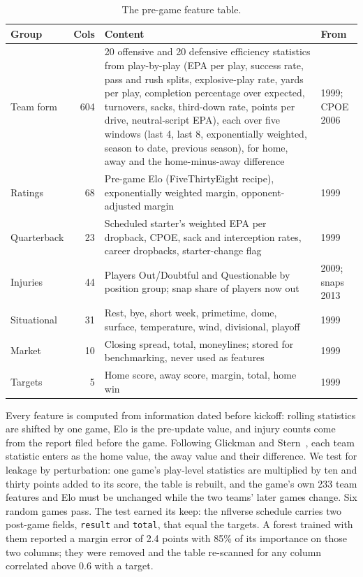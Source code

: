 \begin{table}[H]
\centering
\small
\begin{tabular}{p{2.2cm}rp{8.3cm}p{1.9cm}}
\toprule
\textbf{Group} & \textbf{Cols} & \textbf{Content} & \textbf{From} \\
\midrule
Team form & 604 & 20 offensive and 20 defensive efficiency statistics from play-by-play (EPA per play, success rate, pass and rush splits, explosive-play rate, yards per play, completion percentage over expected, turnovers, sacks, third-down rate, points per drive, neutral-script EPA), each over five windows (last 4, last 8, exponentially weighted, season to date, previous season), for home, away and the home-minus-away difference & 1999; CPOE 2006 \\
Ratings & 68 & Pre-game Elo (FiveThirtyEight recipe), exponentially weighted margin, opponent-adjusted margin & 1999 \\
Quarterback & 23 & Scheduled starter's weighted EPA per dropback, CPOE, sack and interception rates, career dropbacks, starter-change flag & 1999 \\
Injuries & 44 & Players Out/Doubtful and Questionable by position group; snap share of players now out & 2009; snaps 2013 \\
Situational & 31 & Rest, bye, short week, primetime, dome, surface, temperature, wind, divisional, playoff & 1999 \\
Market & 10 & Closing spread, total, moneylines; stored for benchmarking, never used as features & 1999 \\
Targets & 5 & Home score, away score, margin, total, home win & 1999 \\
\bottomrule
\end{tabular}
\caption{The pre-game feature table.}
\label{tab:features}
\end{table}

Every feature is computed from information dated before kickoff: rolling statistics are shifted by one game, Elo is the pre-update value, and injury counts come from the report filed before the game. Following Glickman and Stern~\cite{glickmanstern2017}, each team statistic enters as the home value, the away value and their difference. We test for leakage by perturbation: one game's play-level statistics are multiplied by ten and thirty points added to its score, the table is rebuilt, and the game's own 233 team features and Elo must be unchanged while the two teams' later games change. Six random games pass. The test earned its keep: the nflverse schedule carries two post-game fields, \texttt{result} and \texttt{total}, that equal the targets. A forest trained with them reported a margin error of 2.4 points with 85\% of its importance on those two columns; they were removed and the table re-scanned for any column correlated above 0.6 with a target.

